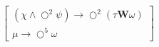 \subsection{}

$
\begin{bmatrix}
(\chi \land \bigcirc^{2} \psi) \rightarrow \bigcirc^{2} (\tau \textbf{W} \omega) \\
\mu \rightarrow \bigcirc^{5} \omega
\end{bmatrix}
$
